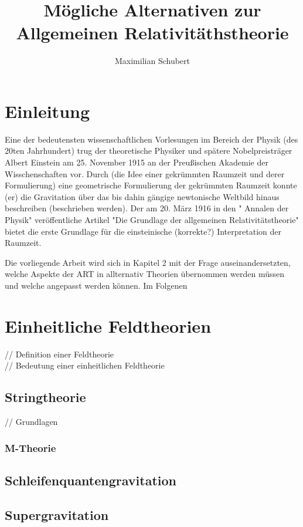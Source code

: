 \documentclass[a4paper, 12pt]{article}
\begin{document}
\title{Mögliche Alternativen zur Allgemeinen Relativitäthstheorie}
\author{Maximilian Schubert}
\date{}
\maketitle
\section{Einleitung} 

Eine der bedeutensten wissenschaftlichen Vorlesungen im Bereich der Physik (des 20ten Jahrhundert) trug der theoretische Physiker und spätere Nobelpreisträger Albert Einstein am 25. November 1915 an der Preußischen Akademie der Wisschenschaften vor. Durch (die Idee einer gekrümmten Raumzeit und derer Formulierung) eine geometrische Formulierung der gekrümmten Raumzeit konnte (er) die Gravitation über das bis dahin gängige newtonische Weltbild hinaus beschreiben (beschrieben werden). Der am 20. März 1916 in den " Annalen der Physik" veröffentliche Artikel "Die Grundlage der allgemeinen Relativitätstheorie"  bietet die erste Grundlage für die einsteinische (korrekte?) Interpretation der Raumzeit. 

Die vorliegende Arbeit wird sich in Kapitel 2 mit der Frage auseinandersetzten, welche Aspekte der ART in allternativ Theorien übernommen werden müssen und welche angepasst werden können. Im Folgenen 
\section{Einheitliche Feldtheorien}
 // Definition einer Feldtheorie\\
 // Bedeutung einer einheitlichen Feldtheorie\\
 
\subsection{Stringtheorie}
// Grundlagen\\

\subsubsection{M-Theorie}

\subsection{Schleifenquantengravitation}

\subsection{Supergravitation}
\end{document}
